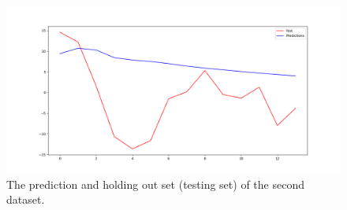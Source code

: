 \begin{figure}[H]
    \centering
    \begin{minipage}[b]{1\textwidth}
        \includegraphics[width=\textwidth]{figures/Ass1/Ass1_D2_AR.png}
    \end{minipage}
    \caption{The prediction and holding out set (testing set) of the second dataset. }
    \label{fig:Ass1_D2_AR}
\end{figure}